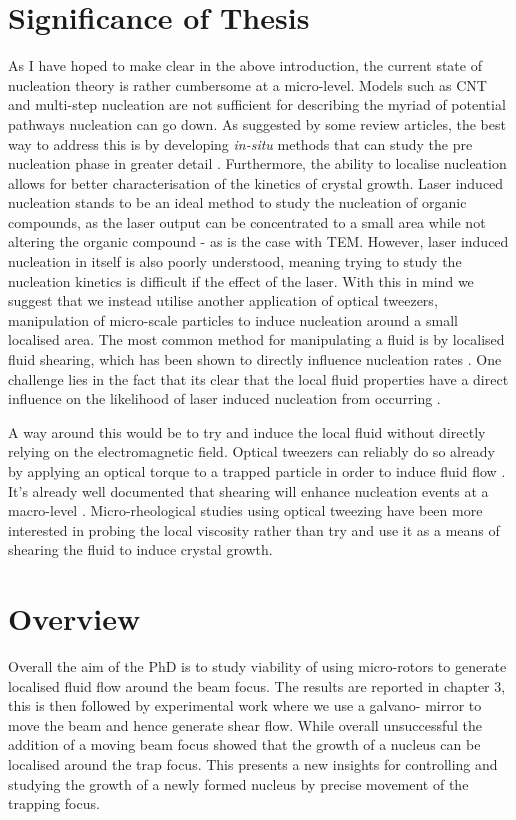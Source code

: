 \section{Significance of Thesis}
As I have hoped to make clear in the above introduction, the 
current state of nucleation theory is rather cumbersome at a 
micro-level. Models such as CNT and multi-step nucleation are 
not sufficient for describing the myriad of potential pathways 
nucleation can go down. As suggested by some review articles, 
the best way to address this is by developing \textit{in-situ} 
methods that can study the pre nucleation phase in greater detail 
\cite{Fu2021}. Furthermore, the ability to localise nucleation 
allows for better characterisation of the kinetics of crystal 
growth. Laser induced nucleation stands to be an ideal method to 
study the nucleation of organic compounds, as the laser output 
can be concentrated to a small area \cite{Korede2023} while not 
altering the organic compound - as is the case with TEM. However,
laser induced nucleation in itself is also poorly understood, 
meaning trying to study the nucleation kinetics is difficult if the
effect of the laser. With this in mind we suggest that we instead 
utilise another application of optical tweezers, manipulation 
of micro-scale particles to induce nucleation around a small 
localised area. The most common method for manipulating a fluid is 
by localised fluid shearing, which has been shown to directly 
influence nucleation rates \cite{Debuysschere2023}. 
One challenge lies in the fact that its clear that the local fluid 
properties have a direct influence on the likelihood of laser
induced nucleation from occurring \cite{Korede2023, Ward2016,
Yuyama2012, Liao2022}. 

A way around this would be to try and induce the local fluid 
without directly relying on the electromagnetic field. Optical 
tweezers can reliably do so already by applying an optical 
torque to a trapped particle in order to induce fluid flow 
\cite{Bishop2004, RobertsonAnderson2018}. It's already well
documented that shearing will enhance nucleation events at a
macro-level \cite{Debuysschere2023}. Micro-rheological studies 
using optical tweezing have been more interested in probing 
the local viscosity rather than try and use it as a means of 
shearing the fluid to induce crystal growth. 

\section{Overview}
Overall the aim of the PhD is to study viability of using 
micro-rotors to generate localised fluid flow around the 
beam focus. The results are reported in chapter 3, this is 
then followed by experimental work where we use a galvano-
mirror to move the beam and hence generate shear flow. While 
overall unsuccessful the addition of a moving beam focus 
showed that the growth of a nucleus can be localised around 
the trap focus. This presents a new insights for controlling 
and studying the growth of a newly formed nucleus by precise 
movement of the trapping focus.

